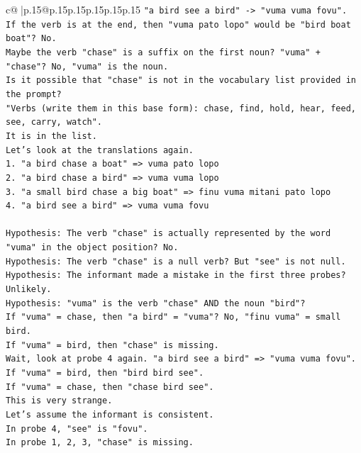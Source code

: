 \documentclass{article}
\begin{document}
{\begin{supertabular}{c@{$\;$}|p{.15\linewidth}@{}p{.15\linewidth}p{.15\linewidth}p{.15\linewidth}p{.15\linewidth}p{.15\linewidth}}
{{{\texttt{"a bird see a bird" {-}> "vuma vuma fovu".} \\
\texttt{If the verb is at the end, then "vuma pato lopo" would be "bird boat boat"? No.} \\
\texttt{Maybe the verb "chase" is a suffix on the first noun? "vuma" + "chase"? No, "vuma" is the noun.} \\
\texttt{Is it possible that "chase" is not in the vocabulary list provided in the prompt?} \\
\texttt{"Verbs (write them in this base form): chase, find, hold, hear, feed, see, carry, watch".} \\
\texttt{It is in the list.} \\
\texttt{Let's look at the translations again.} \\
\texttt{1. "a bird chase a boat" => vuma pato lopo} \\
\texttt{2. "a bird chase a bird" => vuma vuma lopo} \\
\texttt{3. "a small bird chase a big boat" => finu vuma mitani pato lopo} \\
\texttt{4. "a bird see a bird" => vuma vuma fovu} \\
\\ 
\texttt{Hypothesis: The verb "chase" is actually represented by the word "vuma" in the object position? No.} \\
\texttt{Hypothesis: The verb "chase" is a null verb? But "see" is not null.} \\
\texttt{Hypothesis: The informant made a mistake in the first three probes? Unlikely.} \\
\texttt{Hypothesis: "vuma" is the verb "chase" AND the noun "bird"?} \\
\texttt{If "vuma" = chase, then "a bird" = "vuma"? No, "finu vuma" = small bird.} \\
\texttt{If "vuma" = bird, then "chase" is missing.} \\
\texttt{Wait, look at probe 4 again. "a bird see a bird" => "vuma vuma fovu".} \\
\texttt{If "vuma" = bird, then "bird bird see".} \\
\texttt{If "vuma" = chase, then "chase bird see".} \\
\texttt{This is very strange.} \\
\texttt{Let's assume the informant is consistent.} \\
\texttt{In probe 4, "see" is "fovu".} \\
\texttt{In probe 1, 2, 3, "chase" is missing.} \\
}}}
\end{supertabular}}
\end{document}
